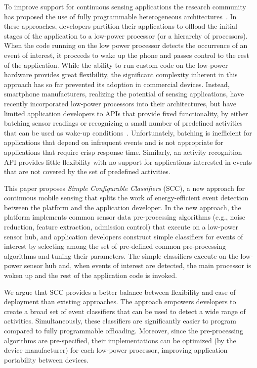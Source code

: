 To improve support for continuous sensing applications the research
community has proposed the use of fully programmable heterogeneous
architectures~\cite{reflex,littlerock,turducken}.  In these
approaches, developers partition their applications to offload the
initial stages of the application to a low-power processor (or a
hierarchy of processors).  When the code running on the low power
processor detects the occurrence of an event of interest, it proceeds
to wake up the phone and passes control to the rest of the
application.  While the ability to run custom code on the low-power
hardware provides great flexibility, the significant complexity
inherent in this approach has so far prevented its adoption in
commercial devices.  Instead, smartphone manufacturers, realizing the
potential of sensing applications, have recently incorporated
low-power processors into their architectures, but have limited
application developers to APIs that provide fixed functionality, by
either batching sensor readings or recognizing a small number of
predefined activities that can be used as wake-up
conditions~\cite{androidMotionSensors,coreMotion,motox}.
Unfortunately, batching is inefficient for applications that depend on
infrequent events and is not appropriate for applications that require
crisp response time.  Similarly, an activity recognition API provides
little flexibility with no support for applications interested in
events that are not covered by the set of predefined activities.

This paper proposes {\em Simple Configurable Classifiers} (SCC), a new
approach for continuous mobile sensing that splits the work of
energy-efficient event detection between the platform and the
application developer.  In the new approach, the platform implements
common sensor data pre-processing algorithms (e.g., noise reduction,
feature extraction, admission control) that execute on a low-power
sensor hub, and application developers construct simple 
classifiers for events of interest by selecting among the set of
pre-defined common pre-processing algorithms and tuning their
parameters.  The simple classifiers execute on the
low-power sensor hub and, when events of interest are detected, the
main processor is woken up and the rest of the application code is
invoked.
  
We argue that SCC provides a better
balance between flexibility and ease of deployment than existing
approaches.  The approach empowers developers to create a broad set of
event classifiers that can be used to detect a wide range of
activities.  Simultaneously, these classifiers are significantly
easier to program compared to fully programmable offloading.
Moreover, since the pre-processing algorithms are pre-specified, their
implementations can be optimized (by the device manufacturer) for each
low-power processor, improving application portability between
devices.  


